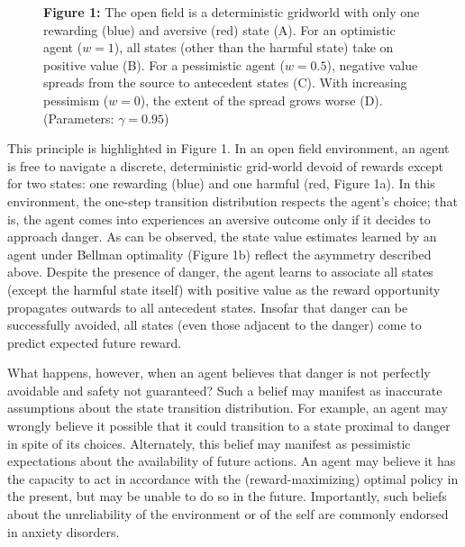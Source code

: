 \documentclass[11pt]{article} %
\begin{document}
\begin{figure}
  \centerline{%
  }
  \par \textbf{Figure 1:} The open field is a deterministic gridworld with only one rewarding (blue) and aversive (red) state (A). For an optimistic agent ($w=1$), all states (other than the harmful state) take on positive value (B). For a pessimistic agent ($w=0.5$), negative value spreads from the source to antecedent states (C). With increasing pessimism ($w=0$), the extent of the spread grows worse (D). (Parameters: $\gamma = 0.95$)
\end{figure}

This principle is highlighted in Figure 1. In an open field environment, an agent is free to navigate a discrete, deterministic grid-world devoid of rewards except for two states: one rewarding (blue) and one harmful (red, Figure 1a). In this environment, the one-step transition distribution respects the agent's choice; that is, the agent comes into experiences an aversive outcome only if it decides to approach danger. As can be observed, the state value estimates learned by an agent under Bellman optimality (Figure 1b) reflect the asymmetry described above. Despite the presence of danger, the agent learns to associate all states (except the harmful state itself) with positive value as the reward opportunity propagates outwards to all antecedent states. Insofar that danger can be successfully avoided, all states (even those adjacent to the danger) come to predict expected future reward.

What happens, however, when an agent believes that danger is not perfectly avoidable and safety not guaranteed? Such a belief may manifest as inaccurate assumptions about the state transition distribution. For example, an agent may wrongly believe it possible that it could transition to a state proximal to danger in spite of its choices. Alternately, this belief may manifest as pessimistic expectations about the availability of future actions. An agent may believe it has the capacity to act in accordance with the (reward-maximizing) optimal policy in the present, but may be unable to do so in the future. Importantly, such beliefs about the unreliability of the environment or of the self are commonly endorsed in anxiety disorders.
\end{document}

